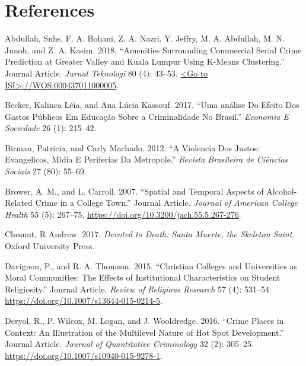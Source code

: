 \documentclass[smallextended]{svjour3}       %
\begin{document}
\hypertarget{references}{%
\section*{References}\label{references}}

\hypertarget{refs}{}
\leavevmode\hypertarget{ref-Abdullah2018amenities}{}%
Abdullah, Snhs, F. A. Bohani, Z. A. Nazri, Y. Jeffry, M. A. Abdullah, M.
N. Junoh, and Z. A. Kasim. 2018. ``Amenities Surrounding Commercial
Serial Crime Prediction at Greater Valley and Kuala Lumpur Using K-Means
Clustering.'' Journal Article. \emph{Jurnal Teknologi} 80 (4): 43--53.
\href{\%3CGo\%20to\%20ISI\%3E://WOS:000437011000005}{\textless{}Go to ISI\textgreater{}://WOS:000437011000005}.

\leavevmode\hypertarget{ref-Becker2017analise}{}%
Becker, Kalinca Léia, and Ana Lúcia Kassouf. 2017. ``Uma análise Do
Efeito Dos Gastos Públicos Em Educação Sobre a Criminalidade No
Brasil.'' \emph{Economia E Sociedade} 26 (1): 215--42.

\leavevmode\hypertarget{ref-Birman2012violencia}{}%
Birman, Patricia, and Carly Machado. 2012. ``A Violencia Dos Justos:
Evangelicos, Midia E Periferias Da Metropole.'' \emph{Revista Brasileira
de Ciências Sociais} 27 (80): 55--69.

\leavevmode\hypertarget{ref-Brower2007spatial}{}%
Brower, A. M., and L. Carroll. 2007. ``Spatial and Temporal Aspects of
Alcohol-Related Crime in a College Town.'' Journal Article.
\emph{Journal of American College Health} 55 (5): 267--75.
\url{https://doi.org/10.3200/jach.55.5.267-276}.

\leavevmode\hypertarget{ref-Chesnut2017devoted}{}%
Chesnut, R Andrew. 2017. \emph{Devoted to Death: Santa Muerte, the
Skeleton Saint}. Oxford University Press.

\leavevmode\hypertarget{ref-Davignon2015christian}{}%
Davignon, P., and R. A. Thomson. 2015. ``Christian Colleges and
Universities as Moral Communities: The Effects of Institutional
Characteristics on Student Religiosity.'' Journal Article. \emph{Review
of Religious Research} 57 (4): 531--54.
\url{https://doi.org/10.1007/s13644-015-0214-5}.

\leavevmode\hypertarget{ref-Deryol2016crime}{}%
Deryol, R., P. Wilcox, M. Logan, and J. Wooldredge. 2016. ``Crime Places
in Context: An Illustration of the Multilevel Nature of Hot Spot
Development.'' Journal Article. \emph{Journal of Quantitative
Criminology} 32 (2): 305--25.
\url{https://doi.org/10.1007/s10940-015-9278-1}.
\end{document}
